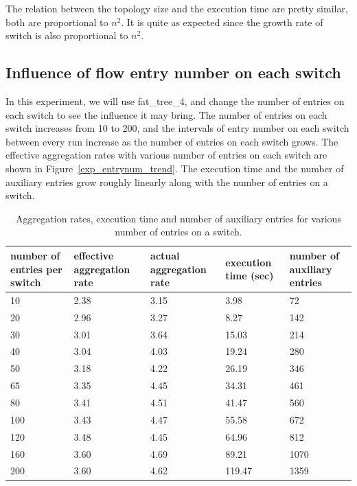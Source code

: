 \documentclass[conference]{IEEEtran}
\begin{document}
The relation between the topology size and the execution time are pretty similar, both are proportional to $n^2$. It is quite as expected since the growth rate of switch is also proportional to $n^2$.

\subsection{Influence of flow entry number on each switch}
In this experiment, we will use fat\_tree\_4, and change the number of entries on each switch to see the influence it may bring. The number of entries on each switch increases from 10 to 200, and the intervals of entry number on each switch between every run increase as the number of entries on each switch grows. The effective aggregation rates with various number of entries on each switch are shown in Figure~\ref{exp_entrynum_trend}. The execution time and the number of auxiliary entries grow roughly linearly along with the number of entries on a switch.

\begin{table}[ht]
\centering
\caption{Aggregation rates, execution time and number of auxiliary entries for various number of entries on a switch.}
\begin{tabular}{|p{1.8cm}|p{1.4cm}|p{1.3cm}|p{1.1cm}|p{1.3cm}|}
\hline number of entries per switch & effective aggregation rate & actual aggregation rate & execution time (sec) & number of auxiliary entries \\
\hline
\hline 10 & 2.38 & 3.15 & 3.98 & 72 \\
\hline 20 & 2.96 & 3.27 & 8.27 & 142 \\
\hline 30 & 3.01 & 3.64 & 15.03 & 214 \\
\hline 40 & 3.04 & 4.03 & 19.24 & 280 \\
\hline 50 & 3.18 & 4.22 & 26.19 & 346 \\
\hline 65 & 3.35 & 4.45 & 34.31 & 461 \\
\hline 80 & 3.41 & 4.51 & 41.47 & 560 \\
\hline 100 & 3.43 & 4.47 & 55.58 & 672 \\
\hline 120 & 3.48 & 4.45 & 64.96 & 812 \\
\hline 160 & 3.60 & 4.69 & 89.21 & 1070 \\
\hline 200 & 3.60 & 4.62 & 119.47 & 1359 \\
\hline 
\end{tabular}
\label{table:different_entry_per_switch}
\end{table}
\end{document}
